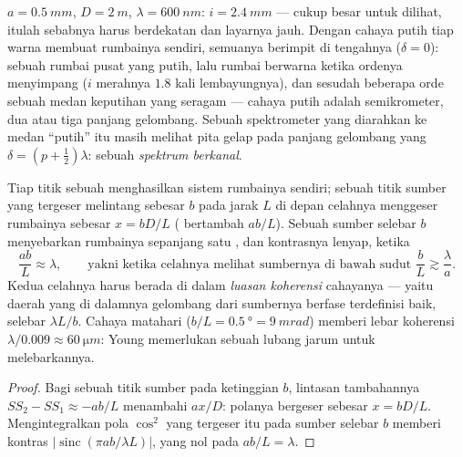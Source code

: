 \begin{example}\label{ex:b2:two-wave-interference:numbers}
$a = \qty{0.5}{mm}$, $D = \qty{2}{m}$, $\lambda = \qty{600}{nm}$: $i = \qty{2.4}{mm}$ --- cukup
besar untuk dilihat, itulah sebabnya  harus berdekatan dan layarnya
jauh. Dengan cahaya putih tiap warna membuat rumbainya sendiri, semuanya
berimpit di tengahnya ($\delta = 0$): sebuah rumbai pusat yang putih, lalu
rumbai berwarna ketika ordenya menyimpang ($i$ merahnya $1.8$ kali
lembayungnya), dan sesudah beberapa orde sebuah medan keputihan yang seragam ---
 cahaya putih adalah semikrometer, dua atau tiga
panjang gelombang. Sebuah spektrometer yang diarahkan ke medan ``putih'' itu masih melihat
pita gelap pada panjang gelombang yang $\delta = (p + \tfrac12)\lambda$: sebuah
\emph{spektrum berkanal}.
\end{example}

\begin{proposition}\label{prop:b2:two-wave-interference:spatial}
Tiap titik sebuah  menghasilkan sistem rumbainya sendiri; sebuah
titik sumber yang tergeser melintang sebesar $b$ pada jarak $L$ di depan
celahnya menggeser rumbainya sebesar $x = bD/L$ ( bertambah
$ab/L$). Sebuah sumber selebar $b$ menyebarkan rumbainya sepanjang satu ,
dan kontrasnya lenyap, ketika
\[
\frac{ab}L \approx \lambda , \qquad\text{yakni ketika celahnya melihat sumbernya di bawah sudut } \frac bL \gtrsim \frac\lambda a .
\]
Kedua celahnya harus berada di dalam \emph{luasan koherensi} cahayanya ---
yaitu daerah yang di dalamnya gelombang dari sumbernya berfase
terdefinisi baik, selebar $\lambda L/b$. Cahaya matahari ($b/L = \qty{0.5}{\degree} = \qty{9}{mrad}$)
memberi lebar koherensi $\lambda/0.009 \approx \qty{60}{\micro m}$: Young memerlukan sebuah
lubang jarum untuk melebarkannya.
\end{proposition}

\begin{proof}
Bagi sebuah titik sumber pada ketinggian $b$, lintasan tambahannya $SS_2 - SS_1 \approx -ab/L$
menambahi $ax/D$: polanya bergeser sebesar $x = bD/L$. Mengintegralkan
pola $\cos^2$ yang tergeser itu pada sumber selebar $b$ memberi kontras
$|\operatorname{sinc}(\pi ab/\lambda L)|$, yang nol pada $ab/L = \lambda$.
\end{proof}

